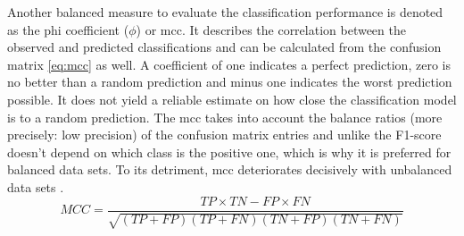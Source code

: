 Another balanced measure to evaluate the classification performance is denoted as the phi coefficient (\( \phi \)) or \acrshort{mcc}. It describes the correlation between the observed and predicted classifications and can be calculated from the confusion matrix \cref{eq:mcc} as well. A coefficient of one indicates a perfect prediction, zero is no better than a random prediction and minus one indicates the worst prediction possible. It does not yield a reliable estimate on how close the classification model is to a random prediction. The \acrshort{mcc} takes into account the balance ratios (more precisely: low precision) of the confusion matrix entries and unlike the F1-score doesn't depend on which class is the positive one, which is why it is preferred for balanced data sets. To its detriment, \acrshort{mcc} deteriorates decisively with unbalanced data sets \cite{Zhu.2020}.
\begin{equation}
    MCC = \frac{TP \times TN - FP \times FN}{\sqrt{(TP + FP)(TP + FN)(TN + FP)(TN + FN)}}
    \label{eq:mcc}
\end{equation}

